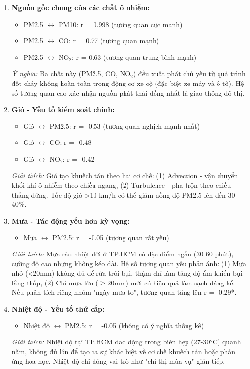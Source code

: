 \documentclass[12pt,a4paper]{article}
\begin{document}
\begin{enumerate}
    \item \textbf{Nguồn gốc chung của các chất ô nhiễm:}
    \begin{itemize}
        \item PM2.5 $\leftrightarrow$ PM10: r = 0.998 (tương quan cực mạnh)
        \item PM2.5 $\leftrightarrow$ CO: r = 0.77 (tương quan mạnh)
        \item PM2.5 $\leftrightarrow$ NO$_2$: r = 0.63 (tương quan trung bình-mạnh)
    \end{itemize}
    
    \textit{Ý nghĩa:} Ba chất này (PM2.5, CO, NO$_2$) đều xuất phát chủ yếu từ quá trình đốt cháy không hoàn toàn trong động cơ xe cộ (đặc biệt xe máy và ô tô). Hệ số tương quan cao xác nhận nguồn phát thải đồng nhất là giao thông đô thị.
    
    \item \textbf{Gió - Yếu tố kiểm soát chính:}
    \begin{itemize}
        \item Gió $\leftrightarrow$ PM2.5: r = -0.53 (tương quan nghịch mạnh nhất)
        \item Gió $\leftrightarrow$ CO: r = -0.48
        \item Gió $\leftrightarrow$ NO$_2$: r = -0.42
    \end{itemize}
    
    \textit{Giải thích:} Gió tạo khuếch tán theo hai cơ chế: (1) Advection - vận chuyển khối khí ô nhiễm theo chiều ngang, (2) Turbulence - pha trộn theo chiều thẳng đứng. Tốc độ gió >10 km/h có thể giảm nồng độ PM2.5 lên đến 30-40\%.
    
    \item \textbf{Mưa - Tác động yếu hơn kỳ vọng:}
    \begin{itemize}
        \item Mưa $\leftrightarrow$ PM2.5: r = -0.05 (tương quan rất yếu)
    \end{itemize}
    
    \textit{Giải thích:} Mưa rào nhiệt đới ở TP.HCM có đặc điểm ngắn (30-60 phút), cường độ cao nhưng không kéo dài. Hệ số tương quan yếu phản ánh: (1) Mưa nhỏ (<20mm) không đủ để rửa trôi bụi, thậm chí làm tăng độ ẩm khiến bụi lắng thấp, (2) Chỉ mưa lớn ($\geq$20mm) mới có hiệu quả làm sạch đáng kể. Nếu phân tích riêng nhóm "ngày mưa to", tương quan tăng lên r = -0.29*.
    
    \item \textbf{Nhiệt độ - Yếu tố thứ cấp:}
    \begin{itemize}
        \item Nhiệt độ $\leftrightarrow$ PM2.5: r = -0.05 (không có ý nghĩa thống kê)
    \end{itemize}
    
    \textit{Giải thích:} Nhiệt độ tại TP.HCM dao động trong biên hẹp (27-30°C) quanh năm, không đủ lớn để tạo ra sự khác biệt về cơ chế khuếch tán hoặc phản ứng hóa học. Nhiệt độ chỉ đóng vai trò như "chỉ thị mùa vụ" gián tiếp.
\end{enumerate}
\end{document}
